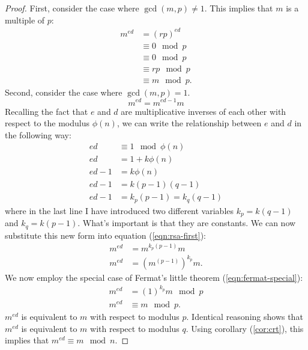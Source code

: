 \documentclass[]{scrartcl}
\theoremstyle{definition}
\let\oldref\ref
\renewcommand{\ref}[1]{(\oldref{#1})}
\begin{document}
\begin{proof}
    First, consider the case where $\gcd(m,p) \neq 1$. This implies that $m$ is a multiple of $p$:
    \begin{align*}
        m^{ed} &=(rp)^{ed} \\
        &\equiv 0 \mod p \\
        &\equiv 0 \mod p \\
        &\equiv rp \mod p \\
        &\equiv m \mod p.
    \end{align*}
    Second, consider the case where $\gcd(m,p)=1$. 
    \begin{equation}\label{eqn:rsa-first}
        m^{ed} = m^{ed-1}m
    \end{equation}
    Recalling the fact that $e$ and $d$ are multiplicative inverses of each other with respect to the modulus $\phi(n)$, we can write the relationship between $e$ and $d$ in the following way:
    \begin{align*}
        ed &\equiv 1 \mod \phi(n) \\
        ed &=1 + k\phi(n) \\
        ed - 1 &= k\phi(n) \\
        ed - 1 &= k(p-1)(q-1) \\
        ed - 1 &= k_p(p-1) = k_q(q-1)
    \end{align*}
    where in the last line I have introduced two different variables $k_p = k(q-1)$ and $k_q=k(p-1)$. What's important is that they are constants. We can now substitute this new form into equation \ref{eqn:rsa-first}:
    \begin{align*}
        m^{ed} &= m^{k_p(p-1)}m \\
        m^{ed} &= \left(m^{(p-1)}\right)^{k_p}m.
    \end{align*}
    We now employ the special case of Fermat's little theorem \ref{eqn:fermat-special}:
    \begin{align*}
        m^{ed} &= (1)^{k_p}m \mod p \\
        m^{ed} &\equiv m \mod p.
    \end{align*}
    $m^{ed}$ is equivalent to $m$ with respect to modulus $p$. Identical reasoning shows that $m^{ed}$ is equivalent to $m$ with respect to modulus $q$. Using corollary \ref{cor:crt}, this implies that $m^{ed} \equiv m \mod n$.
\end{proof}
\end{document}
